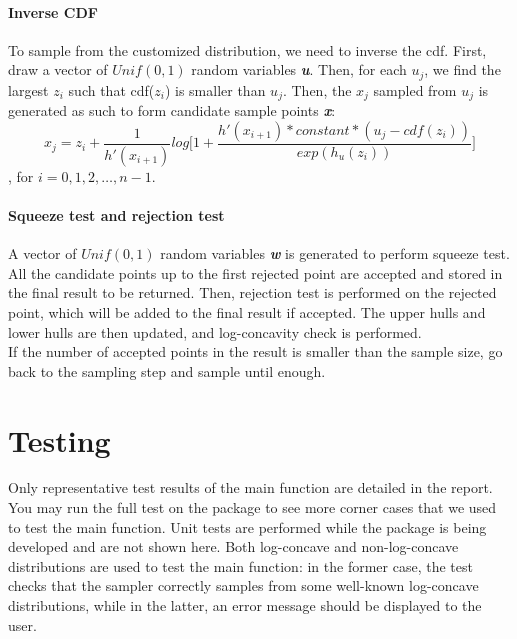 \documentclass{article}\usepackage[]{graphicx}\usepackage[]{color}
\begin{document}
\paragraph{Inverse CDF}
To sample from the customized distribution, we need to inverse the cdf. First, 
draw a vector of $Unif(0,1)$ random variables \textbf{\textit{u}}. Then, for each 
$u_j$, we find the largest $z_i$ such that cdf($z_i$) is smaller than $u_j$. Then,
the $x_j$ sampled from $u_j$ is generated as such to form candidate sample
points \textbf{\textit{x}}:\\
\[
x_j = z_i + \frac{1}{h'(x_{i+1})}log \Big[1 + \frac{h'(x_{i+1})*constant*(u_j - cdf(z_i))}{exp(h_u(z_i))} \Big]
\]
, for $i = 0, 1, 2, \dots, n-1$.
\paragraph{Squeeze test and rejection test}
A vector of $Unif(0,1)$ random variables \textbf{\textit{w}} is generated to
perform squeeze test. All the candidate points up to the first rejected point
are accepted and stored in the final result to be returned. Then, rejection test
is performed on the rejected point, which will be added to the final result if 
accepted. The upper hulls and lower hulls are then updated, and log-concavity
check is performed.\\
If the number of accepted points in the result is smaller than the sample size,
go back to the sampling step and sample until enough.

\section{Testing}
Only representative test results of the main function are detailed in the report.
You may run the full test on the package to see more corner cases that we used to
test the main function.
Unit tests are performed while the package is being developed and are not shown here. 
Both log-concave and non-log-concave distributions are used to test the main function: 
in the former case, the test checks that the sampler correctly samples from some 
well-known log-concave distributions, while in the latter,
an error message should be displayed to the user.\\
\end{document}
